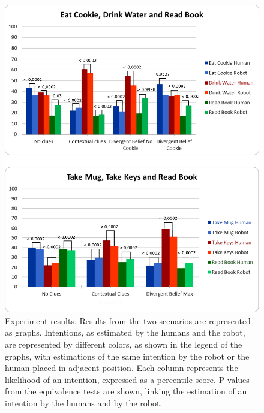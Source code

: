  \begin{figure}[h!]
	\centering
	\includegraphics[clip,scale=0.32]{img/situation_assessment/pvalues1.pdf}
	\caption{Experiment results. Results from the two scenarios are represented as graphs. Intentions, as estimated by the humans and the robot, are represented by different colors, as shown in the legend of the graphs, with estimations of the same intention by the robot or the human placed in adjacent position. Each column represents the likelihood of an intention, expressed as a percentile score. P-values from the equivalence tests are shown, linking the estimation of an intention by the humans and by the robot.}
	\label{fig:situation_assessment-user_study_results}
\end{figure}



